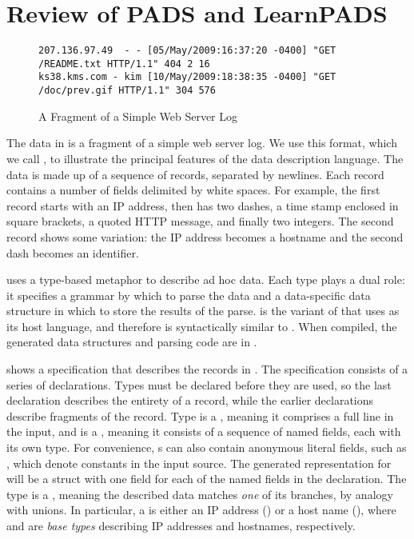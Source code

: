 \section{Review of PADS and LearnPADS}\label{sec:review}
\begin{figure*}
{\footnotesize
\begin{verbatim}
207.136.97.49  - - [05/May/2009:16:37:20 -0400] "GET /README.txt HTTP/1.1" 404 2 16
ks38.kms.com - kim [10/May/2009:18:38:35 -0400] "GET /doc/prev.gif HTTP/1.1" 304 576
\end{verbatim}
}
\caption{A Fragment of a Simple Web Server Log \ai{}}
\label{fig:ai} 
\end{figure*}

The data in  is a fragment of a simple web server log.
We use this format, which we call
\ai{}, to illustrate the principal features of the \pads{} data
description language. The data 
is made up of a sequence of records, separated by newlines.
Each record contains a number of fields delimited by white spaces. 
For example, the first record starts with an IP address, 
then has two dashes, a time stamp enclosed in
square brackets, a quoted HTTP message, and finally two
integers. The second record shows some variation:
the IP address becomes a hostname and the second dash becomes an identifier.

\pads{} uses a type-based metaphor to
describe ad hoc data.  Each \pads{} type plays a dual role: it
specifies a grammar by which to parse the data and a data-specific
data structure in which to store the results of the parse. 
\padsc{} is the variant of \pads{} that uses \C{} as its host
language, and therefore is syntactically similar to \C{}. 
When compiled, the generated data structures and parsing code 
are in \C{}.

 shows a \padsc{} specification that describes the
records in .  
The specification consists of a
series of declarations. Types must be declared before they are used,
so the last declaration  describes the entirety of a
record, while the earlier declarations describe fragments of the record.  
Type  is a , meaning it comprises a full line in
the input, and is a , meaning it consists of a sequence of
named fields, each with its own type.  For convenience, s
can also contain anonymous literal fields, such as \cd{" ["}, which
denote constants in the input source.  The generated representation
for  will be a \C{} struct with one field for each of the
named fields in the declaration.
The type  is a , meaning the described data
matches \textit{one} of its branches, by analogy with \C{} unions. In
particular, a  is either an IP address () or a
host name (), where  and  are
\padsc{} \textit{base types} describing IP addresses and hostnames,
respectively.  

